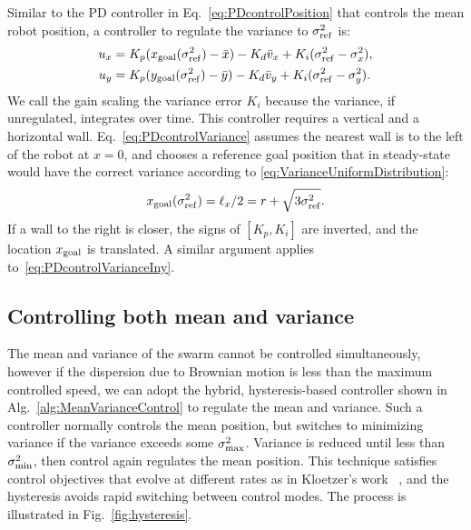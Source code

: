 Similar to the PD controller in Eq.~\eqref{eq:PDcontrolPosition} that controls the mean robot position, a controller to regulate the variance to $\sigma^2_{\rm{ref}}$ is:
\begin{align}
u_x &= K_{p}(x_{\rm{goal}}(\sigma^2_{\rm{ref}}) - \bar{x}) - K_{d}\bar{v}_x + K_{i}(\sigma^2_{\rm{ref}}-\sigma^2_{x}),   \label{eq:PDcontrolVariance}\\
u_y &= K_{p}(y_{\rm{goal}}(\sigma^2_{\rm{ref}})  - \bar{y}) - K_{d}\bar{v}_y + K_{i}(\sigma^2_{\rm{ref}}-\sigma^2_{y}).  \label{eq:PDcontrolVarianceIny}
\end{align}
We call the gain scaling the variance error $K_i$ because the variance, if unregulated, integrates over time. This controller requires a vertical and a horizontal wall.
Eq.~\eqref{eq:PDcontrolVariance} assumes the nearest wall is to the left of the robot at $x=0$, and chooses a reference goal position that in steady-state would have the correct variance according to \eqref{eq:VarianceUniformDistribution}:
\begin{align}
x_{\rm{goal}}(\sigma^2_{\rm{ref}}) = \ell_x/2 = r + \sqrt{3\sigma^2_{\rm{ref}}}.
\end{align}
 If a wall to the right is closer, the signs of $[K_p,K_i]$ are inverted, and the location $x_{\rm{goal}}$ is translated.  A similar argument applies to~\eqref{eq:PDcontrolVarianceIny}.


\subsection{Controlling both mean and variance}

The mean and variance of the swarm cannot be controlled simultaneously, however if the dispersion due to Brownian motion is less than the maximum controlled speed, we can adopt the hybrid, hysteresis-based controller shown in Alg.~\ref{alg:MeanVarianceControl} to regulate the mean and variance.  Such a controller normally controls the mean position, but switches to minimizing variance if the variance exceeds some $\sigma_{\rm{max}}^2$. 
 Variance is reduced until less than $\sigma_{\rm{min}}^2$, then control again regulates the mean position. 
 This technique satisfies control objectives that evolve at different rates as in Kloetzer's work ~\cite{kloetzer2007temporal}, and the hysteresis avoids rapid switching between control modes. The process is illustrated in Fig.~\ref{fig:hysteresis}. 


